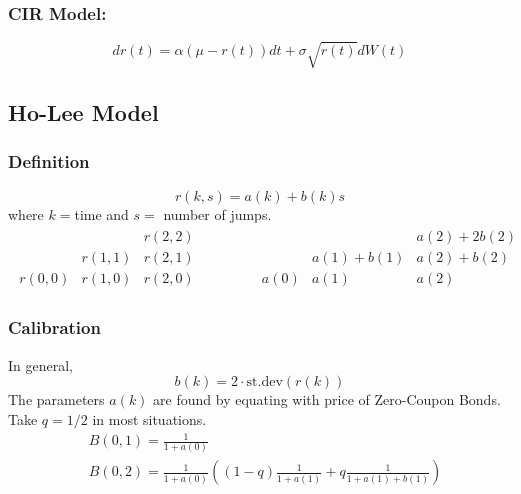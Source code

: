 \documentclass[11pt]{article}
\begin{document}
	\subsubsection{CIR Model:}
	\[	dr(t) = \alpha(\mu - r(t))dt + \sigma\sqrt{r(t)} dW(t)
		\]
	
	\subsection{Ho-Lee Model}
	\subsubsection{Definition}
	\[	r(k, s) = a(k) + b(k) s
		\]
	where \( k = \)time and \( s =  \) number of jumps. 
	\begin{align*}
		\begin{matrix}
		  	& & r(2,2)\\
			& r(1, 1) & r(2,1)\\
		r(0, 0)	& r(1, 0) & r(2,0)
		\end{matrix}
		\qquad\qquad
		\begin{matrix}
			& & a(2) + 2b(2)\\
			& a(1) + b(1) & a(2) +b(2)\\
			a(0) & a(1) & a(2)
		\end{matrix}
	\end{align*}
	\subsubsection{Calibration}
	In general,
	\[	b(k) = 2\cdot \text{st.dev}(r(k))
		\]
	The parameters \( a(k) \) are found by equating with price of Zero-Coupon Bonds. Take \( q = 1/2 \) in most situations.
	\begin{align*}
			& B(0, 1) = \frac{1}{1+a(0)}\\[3pt]
			& B(0,2) = \frac{1}{1+a(0)}\left((1 - q)\frac{1}{1 + a(1)} + q\frac{1}{1 + a(1) + b(1)}\right)
	\end{align*}
	
\end{document}
